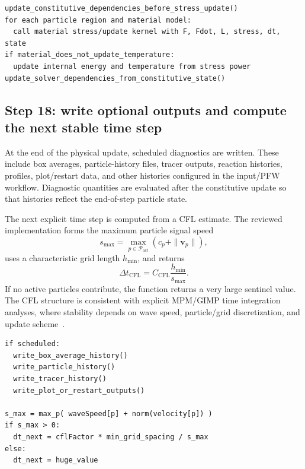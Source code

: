 \begin{lstlisting}[caption={Constitutive and thermal update.},basicstyle=\ttfamily\small]
update_constitutive_dependencies_before_stress_update()
for each particle region and material model:
  call material stress/update kernel with F, Fdot, L, stress, dt, state
if material_does_not_update_temperature:
  update internal energy and temperature from stress power
update_solver_dependencies_from_constitutive_state()
\end{lstlisting}

\subsection{Step 18: write optional outputs and compute the next stable time step}
\label{subsec:solver-step-18}
At the end of the physical update, scheduled diagnostics are written.  These include box averages, particle-history files, tracer outputs, reaction histories, profiles, plot/restart data, and other histories configured in the input/PFW workflow.  Diagnostic quantities are evaluated after the constitutive update so that histories reflect the end-of-step particle state.

The next explicit time step is computed from a CFL estimate.  The reviewed implementation forms the maximum particle signal speed
\begin{equation}
  s_{\max}=\max_{p\in\mathcal{P}_{\mathrm{act}}}\left(c_p+\|\mathbf{v}_p\|\right),
\end{equation}
uses a characteristic grid length $h_{\min}$, and returns
\begin{equation}
  \Delta t_{\mathrm{CFL}} = C_{\mathrm{CFL}}\frac{h_{\min}}{s_{\max}}.
\end{equation}
If no active particles contribute, the function returns a very large sentinel value.  The CFL structure is consistent with explicit MPM/GIMP time integration analyses, where stability depends on wave speed, particle/grid discretization, and update scheme~\cite{wallstedt2008explicit,guilkey2003implicit}.

\begin{lstlisting}[caption={Output and stable time step.},basicstyle=\ttfamily\small]
if scheduled:
  write_box_average_history()
  write_particle_history()
  write_tracer_history()
  write_plot_or_restart_outputs()

s_max = max_p( waveSpeed[p] + norm(velocity[p]) )
if s_max > 0:
  dt_next = cflFactor * min_grid_spacing / s_max
else:
  dt_next = huge_value
\end{lstlisting}

